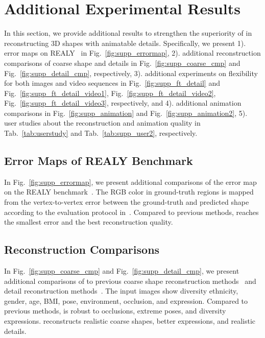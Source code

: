 \section{Additional Experimental Results} \label{sec.supp_exp}

In this section, we provide additional results to strengthen the superiority of {\name} in reconstructing 3D shapes with animatable details. Specifically, we present 1). error maps on REALY~ in Fig.~\ref{fig:supp_errormap}, 2). additional reconstruction comparisons of coarse shape and details in Fig.~\ref{fig:supp_coarse_cmp} and Fig.~\ref{fig:supp_detail_cmp}, respectively, 3). additional experiments on flexibility for both images and video sequences in Fig.~\ref{fig:supp_ft_detail} and Fig.~\ref{fig:supp_ft_detail_video1}, Fig.~\ref{fig:supp_ft_detail_video2},  Fig.~\ref{fig:supp_ft_detail_video3}, respectively, and 4). additional animation comparisons in Fig.~\ref{fig:supp_animation} and Fig.~\ref{fig:supp_animation2}, 5). user studies about the reconstruction and animation quality in Tab.~\ref{tab:userstudy} and Tab.~\ref{tab:supp_user2}, respectively.

\subsection{Error Maps of REALY Benchmark}


In Fig.~\ref{fig:supp_errormap}, we present additional comparisons of the error map on the REALY benchmark~. The RGB color in ground-truth regions is mapped from the vertex-to-vertex error between the ground-truth and predicted shape according to the evaluation protocol in~. Compared to previous methods, {\name} reaches the smallest error and the best reconstruction quality.









\subsection{Reconstruction Comparisons}


In Fig.~\ref{fig:supp_coarse_cmp} and Fig.~\ref{fig:supp_detail_cmp}, we present additional comparisons of {\name} to previous coarse shape reconstruction methods~ and detail reconstruction methods~. The input images show diversity {\wrt} ethnicity, gender, age, BMI, pose, environment, occlusion, and expression.
Compared to previous methods, {\name} is robust to occlusions, extreme poses, and diversity expressions. {\name} reconstructs realistic coarse shapes, better expressions, and realistic details. 




